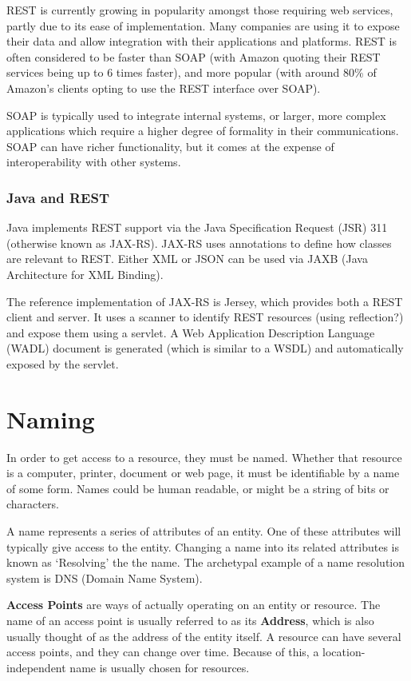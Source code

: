 \documentclass{article}
\begin{document}
REST is currently growing in popularity amongst those requiring web services, partly due to its ease of implementation. Many companies are using it to expose their data and allow integration with their applications and platforms. REST is often considered to be faster than SOAP (with Amazon quoting their REST services being up to 6 times faster), and more popular (with around 80\% of Amazon's clients opting to use the REST interface over SOAP).

SOAP is typically used to integrate internal systems, or larger, more complex applications which require a higher degree of formality in their communications. SOAP can have richer functionality, but it comes at the expense of interoperability with other systems. 

\subsubsection{Java and REST}
Java implements REST support via the Java Specification Request (JSR) 311 (otherwise known as JAX-RS). JAX-RS uses annotations to define how classes are relevant to REST. Either XML or JSON can be used via JAXB (Java Architecture for XML Binding).

The reference implementation of JAX-RS is Jersey, which provides both a REST client and server. It uses a scanner to identify REST resources (using reflection?) and expose them using a servlet. A Web Application Description Language (WADL) document is generated (which is similar to a WSDL) and automatically exposed by the servlet. 

\section{Naming}
In order to get access to a resource, they must be named. Whether that resource is a computer, printer, document or web page, it must be identifiable by a name of some form. Names could be human readable, or might be a string of bits or characters. 

A name represents a series of attributes of an entity. One of these attributes will typically give access to the entity. Changing a name into its related attributes is known as `Resolving' the the name. The archetypal example of a name resolution system is DNS (Domain Name System).

\textbf{Access Points} are ways of actually operating on an entity or resource. The name of an access point is usually referred to as its \textbf{Address}, which is also usually thought of as the address of the entity itself. A resource can have several access points, and they can change over time. Because of this, a location-independent name is usually chosen for resources. 
\end{document}
